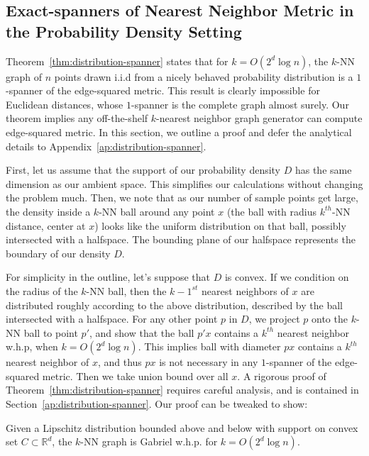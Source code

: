 \subsection{Exact-spanners of Nearest Neighbor Metric in
the Probability Density Setting
}\label{sec:distribution-spanner}

Theorem~\ref{thm:distribution-spanner} states that for $k= O(2^d \log n)$, the $k$-NN graph of $n$ points drawn i.i.d from
a nicely behaved probability distribution is a $1$-spanner of the
edge-squared metric. 
This result is clearly impossible for Euclidean distances,
whose $1$-spanner is the complete graph almost surely.  
Our theorem implies any off-the-shelf
$k$-nearest neighbor graph generator can compute
edge-squared metric. In this section, we outline a proof and
defer the analytical details to
Appendix~\ref{ap:distribution-spanner}.


First, let us assume that the support of our
probability density $D$ has the same dimension as our ambient space.
This simplifies our calculations without changing the problem
much. Then, we note that as our number of sample points get
large, the density inside a $k$-NN ball around any point $x$ (the ball with radius
$k^{th}$-NN
distance, center at $x$) looks like the uniform distribution
on that ball, possibly intersected with a halfspace. The bounding
plane of our halfspace
represents the boundary of our density $D$.

For simplicity in the outline, let's suppose that $D$ is convex.
If we condition on
the radius of the $k$-NN ball, then the $k-1^{st}$ nearest
neighbors of $x$ are distributed roughly according to the above
distribution, described by the ball intersected with a halfspace.
For any other point $p$ in $D$, we project $p$ onto the $k$-NN
ball to point $p'$, and show that the ball $p'x$ contains a $k^{th}$ nearest
neighbor w.h.p, when $k=O(2^d \log n)$. This
implies ball with diameter $px$ contains a $k^{th}$ nearest
neighbor of $x$, and thus $px$ is not necessary in any
$1$-spanner of the edge-squared metric. Then we take union bound
over all $x$.
A rigorous proof of
Theorem~\ref{thm:distribution-spanner} requires careful analysis, 
and is contained in
Section~\ref{ap:distribution-spanner}.  
Our proof can be tweaked to show:
\begin{theorem}
  Given a Lipschitz distribution bounded above and below with support on convex set $C \subset
  \mathbb{R}^d$, the $k$-NN graph is Gabriel w.h.p. for $k =
  O(2^d \log n)$.
\end{theorem}
